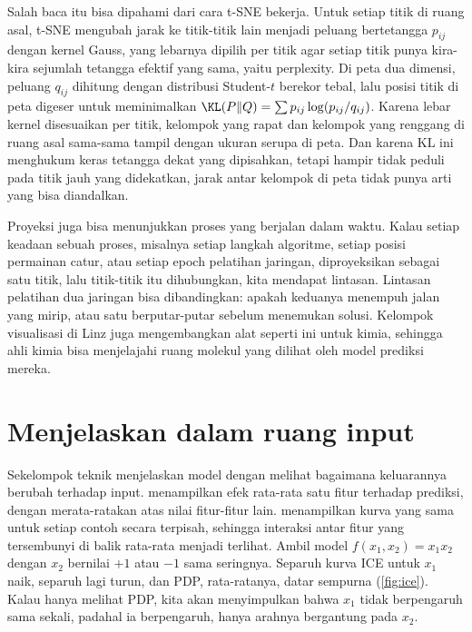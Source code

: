 Salah baca itu bisa dipahami dari cara t-SNE bekerja. Untuk setiap titik di ruang asal, t-SNE mengubah jarak ke
titik-titik lain menjadi peluang bertetangga $p_{ij}$ dengan kernel Gauss, yang lebarnya dipilih per titik agar setiap
titik punya kira-kira sejumlah tetangga efektif yang sama, yaitu perplexity. Di peta dua dimensi, peluang $q_{ij}$
dihitung dengan distribusi Student-$t$ berekor tebal, lalu posisi titik di peta digeser untuk meminimalkan
$\KL(P\|Q)=\sum p_{ij}\log(p_{ij}/q_{ij})$. Karena lebar kernel disesuaikan per titik, kelompok yang rapat dan kelompok
yang renggang di ruang asal sama-sama tampil dengan ukuran serupa di peta. Dan karena KL ini menghukum keras tetangga
dekat yang dipisahkan, tetapi hampir tidak peduli pada titik jauh yang didekatkan, jarak antar kelompok di peta tidak
punya arti yang bisa diandalkan.

Proyeksi juga bisa menunjukkan proses yang berjalan dalam waktu. Kalau setiap keadaan sebuah proses,
misalnya setiap langkah algoritme, setiap posisi permainan catur, atau setiap epoch pelatihan
jaringan, diproyeksikan sebagai satu titik, lalu titik-titik itu dihubungkan, kita mendapat lintasan.
Lintasan pelatihan dua jaringan bisa dibandingkan: apakah keduanya menempuh jalan yang mirip, atau
satu berputar-putar sebelum menemukan solusi. Kelompok visualisasi di Linz juga mengembangkan alat
seperti ini untuk kimia, sehingga ahli kimia bisa menjelajahi ruang molekul yang dilihat oleh model
prediksi mereka.

\section{Menjelaskan dalam ruang input}

Sekelompok teknik menjelaskan model dengan melihat bagaimana keluarannya berubah terhadap input.
 menampilkan efek rata-rata satu fitur terhadap prediksi, dengan
merata-ratakan atas nilai fitur-fitur lain.  menampilkan
kurva yang sama untuk setiap contoh secara terpisah, sehingga interaksi antar fitur yang tersembunyi
di balik rata-rata menjadi terlihat. Ambil model $f(x_1,x_2)=x_1x_2$ dengan $x_2$ bernilai $+1$ atau $-1$ sama seringnya.
Separuh kurva ICE untuk $x_1$ naik, separuh lagi turun, dan PDP, rata-ratanya, datar sempurna (\cref{fig:ice}). Kalau
hanya melihat PDP, kita akan menyimpulkan bahwa $x_1$ tidak berpengaruh sama sekali, padahal ia berpengaruh, hanya
arahnya bergantung pada $x_2$.

